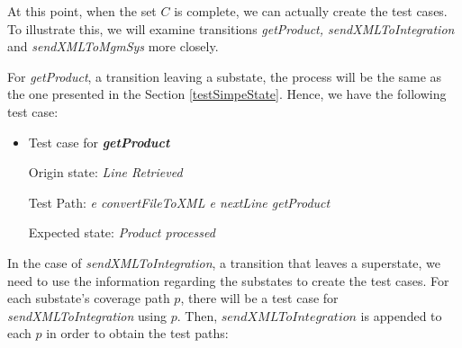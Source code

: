 At this point, when the set $C$ is complete, we can actually create the test cases. To illustrate this, we will examine transitions \textit{getProduct, sendXMLToIntegration} and \textit{sendXMLToMgmSys} more closely.

For \textit{getProduct}, a transition leaving a substate, the process will be the same as the one presented in the Section \ref{testSimpeState}. Hence, we have the following test case:

\begin{itemize}

\item Test case for \textit{\textbf{getProduct}}

Origin state: \textit{Line Retrieved}

Test Path: \textit{e convertFileToXML e nextLine getProduct}

Expected state: \textit{Product processed}

\end{itemize}

In the case of \textit{sendXMLToIntegration}, a transition that leaves a superstate, we need to use the information regarding the substates to create the test cases. For each substate's coverage path $p$, there will be a test case for \textit{sendXMLToIntegration} using $p$. Then, $sendXMLToIntegration$ is appended to each $p$ in order to obtain the test paths:

